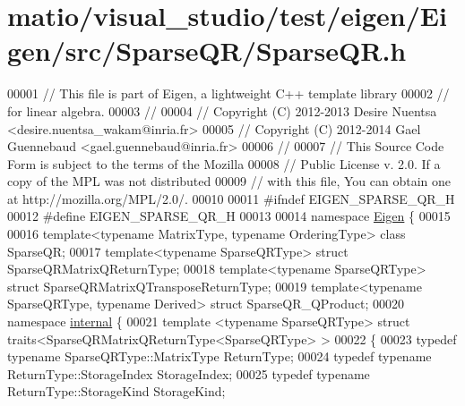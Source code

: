 \hypertarget{matio_2visual__studio_2test_2eigen_2_eigen_2src_2_sparse_q_r_2_sparse_q_r_8h_source}{}\section{matio/visual\+\_\+studio/test/eigen/\+Eigen/src/\+Sparse\+Q\+R/\+Sparse\+QR.h}
\label{matio_2visual__studio_2test_2eigen_2_eigen_2src_2_sparse_q_r_2_sparse_q_r_8h_source}

\begin{DoxyCode}
00001 \textcolor{comment}{// This file is part of Eigen, a lightweight C++ template library}
00002 \textcolor{comment}{// for linear algebra.}
00003 \textcolor{comment}{//}
00004 \textcolor{comment}{// Copyright (C) 2012-2013 Desire Nuentsa <desire.nuentsa\_wakam@inria.fr>}
00005 \textcolor{comment}{// Copyright (C) 2012-2014 Gael Guennebaud <gael.guennebaud@inria.fr>}
00006 \textcolor{comment}{//}
00007 \textcolor{comment}{// This Source Code Form is subject to the terms of the Mozilla}
00008 \textcolor{comment}{// Public License v. 2.0. If a copy of the MPL was not distributed}
00009 \textcolor{comment}{// with this file, You can obtain one at http://mozilla.org/MPL/2.0/.}
00010 
00011 \textcolor{preprocessor}{#ifndef EIGEN\_SPARSE\_QR\_H}
00012 \textcolor{preprocessor}{#define EIGEN\_SPARSE\_QR\_H}
00013 
00014 \textcolor{keyword}{namespace }\hyperlink{namespace_eigen}{Eigen} \{
00015 
00016 \textcolor{keyword}{template}<\textcolor{keyword}{typename} MatrixType, \textcolor{keyword}{typename} OrderingType> \textcolor{keyword}{class }SparseQR;
00017 \textcolor{keyword}{template}<\textcolor{keyword}{typename} SparseQRType> \textcolor{keyword}{struct }SparseQRMatrixQReturnType;
00018 \textcolor{keyword}{template}<\textcolor{keyword}{typename} SparseQRType> \textcolor{keyword}{struct }SparseQRMatrixQTransposeReturnType;
00019 \textcolor{keyword}{template}<\textcolor{keyword}{typename} SparseQRType, \textcolor{keyword}{typename} Derived> \textcolor{keyword}{struct }SparseQR\_QProduct;
00020 \textcolor{keyword}{namespace }\hyperlink{namespaceinternal}{internal} \{
00021   \textcolor{keyword}{template} <\textcolor{keyword}{typename} SparseQRType> \textcolor{keyword}{struct }traits<SparseQRMatrixQReturnType<SparseQRType> >
00022   \{
00023     \textcolor{keyword}{typedef} \textcolor{keyword}{typename} SparseQRType::MatrixType ReturnType;
00024     \textcolor{keyword}{typedef} \textcolor{keyword}{typename} ReturnType::StorageIndex StorageIndex;
00025     \textcolor{keyword}{typedef} \textcolor{keyword}{typename} ReturnType::StorageKind StorageKind;

\end{DoxyCode}
